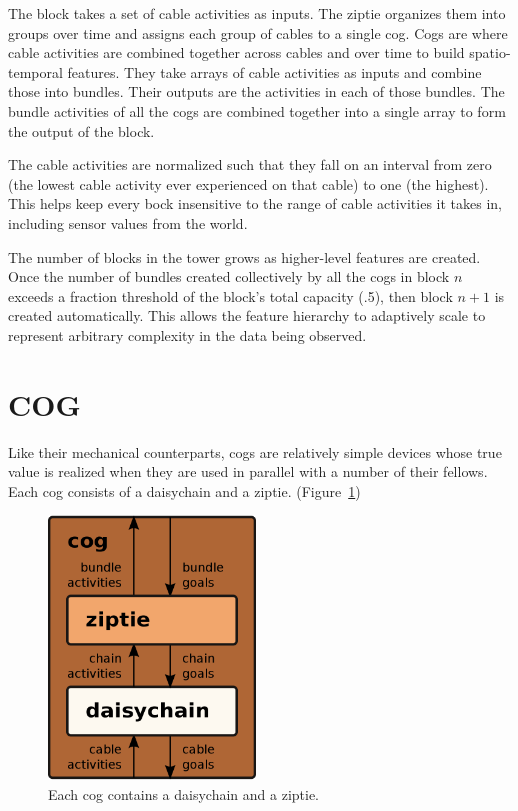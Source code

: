\documentclass[oneside,twocolumn]{article}
\begin{document}
The block takes a set of cable activities as inputs. The ziptie organizes them into groups over time and assigns each group of cables to a single cog. Cogs are where cable activities are combined together across cables and over time to build spatio-temporal features. They take arrays of cable activities as inputs and combine those into bundles. Their outputs are the activities in each of those bundles. The bundle activities of all the cogs are combined together into a single array to form the output of the block.

The cable activities are normalized such that they fall on an interval from zero (the lowest cable activity ever experienced on that cable) to one (the highest). This helps keep every bock  insensitive to the range of cable activities it takes in, including sensor values from the world.

The number of blocks in the tower grows as higher-level features are created. Once the number of bundles created collectively by all the cogs in block $n$ exceeds a fraction threshold of the block's total capacity (.5), then block $n+1$ is created automatically. This allows the feature hierarchy to adaptively scale to represent arbitrary complexity in the data being observed. 

\section*{\color{copper} COG}

Like their mechanical counterparts, cogs are relatively simple devices whose true value is realized when they are used in parallel with a number of their fellows. Each cog consists of a daisychain and a ziptie. (Figure~\ref{cog}) 

\begin{figure}[ht]
\centering
\includegraphics[height=7.0cm]{figs/cog.png}
\caption{Each cog contains a daisychain and a ziptie.}
\label{cog}
\end{figure}
\end{document}
